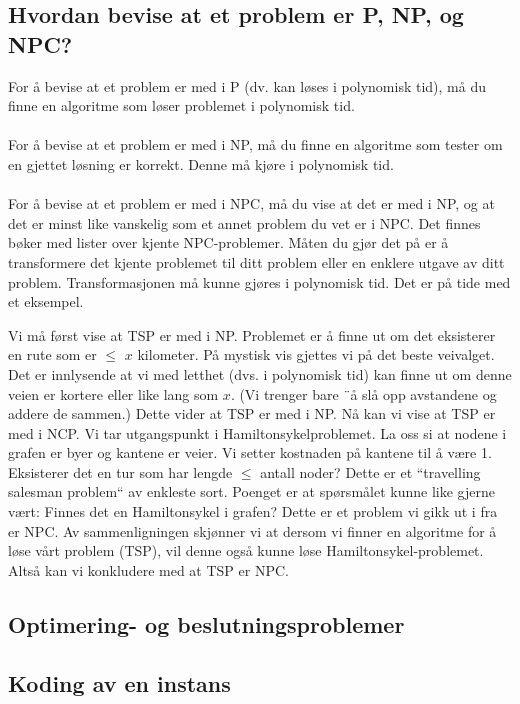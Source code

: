 \subsection{Hvordan bevise at et problem er P, NP, og NPC?}
For å bevise at et problem er med i P (dv. kan løses i polynomisk tid), må du finne en algoritme som løser problemet i polynomisk tid. 
\\\\
For å bevise at et problem er med i NP, må du finne en algoritme som tester om en gjettet løsning er korrekt. Denne må kjøre i polynomisk tid.
\\\\
For å bevise at et problem er med i NPC, må du vise at det er med i NP, og at det er minst like vanskelig som et annet problem du vet er i NPC. Det finnes bøker med lister over kjente NPC-problemer. Måten du gjør det på er å transformere det kjente problemet til ditt problem eller en enklere utgave av ditt problem. Transformasjonen må kunne gjøres i polynomisk tid. Det er på tide med et eksempel.

\begin{boxed}
Vi må først vise at TSP er med i NP. Problemet er å finne ut om det eksisterer en rute som er $\leq$ $x$ kilometer. På mystisk vis gjettes vi på det beste veivalget. Det er innlysende at vi med letthet (dvs. i polynomisk tid) kan finne ut om denne veien er kortere eller like lang som $x$. (Vi trenger bare ¨å slå opp avstandene og addere de sammen.) Dette vider at TSP er med i NP.
\newline
\newline
Nå kan vi vise at TSP er med i NCP. Vi tar utgangspunkt i Hamiltonsykelproblemet. La oss si at nodene i grafen er byer og kantene er veier. Vi setter kostnaden på kantene til å være 1. Eksisterer det en tur som har lengde $\leq$ antall noder? Dette er et ``travelling salesman problem`` av enkleste sort. Poenget er at spørsmålet kunne like gjerne vært: Finnes det en Hamiltonsykel i grafen? Dette er et problem vi gikk ut i fra er NPC.
\newline
\newline
Av sammenligningen skjønner vi at dersom vi finner en algoritme for å løse vårt problem (TSP), vil denne også kunne løse Hamiltonsykel-problemet. Altså kan vi konkludere med at TSP er NPC.
\end{boxed}

\subsection{Optimering- og beslutningsproblemer}
\subsection{Koding av en instans}
